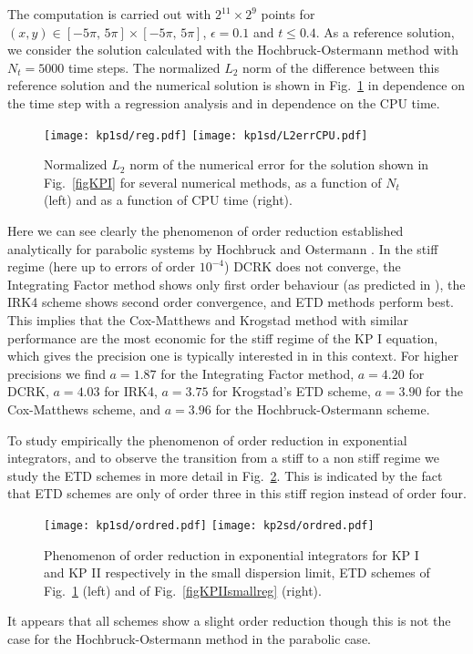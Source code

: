 \documentclass[final]{siamltex}
\begin{document}
The computation
is carried out with $2^{11}\times2^{9}$ points for
$(x, y)\in[-5\pi,\,5\pi]\times[-5\pi,\,5\pi]$,
$\epsilon=0.1$ and $t\leq0.4$. As a reference solution, we consider
the solution calculated with the Hochbruck-Ostermann method with $N_{t}=5000$
time steps. The normalized $L_{2}$ norm of the
difference between this reference solution and the numerical solution
is shown in Fig.~\ref{figKPIsmallreg} in dependence on the time step 
with a regression analysis and  in dependence on the CPU time.
\begin{figure}[htb!]
 \centering
 \texttt{[image: kp1sd/reg.pdf]}
 \texttt{[image: kp1sd/L2errCPU.pdf]}
 \caption{Normalized $L_{2}$ norm of the numerical error for the 
  solution shown in Fig.~\ref{figKPI} for several numerical
  methods, as a function of $N_{t}$  (left) and as a function of CPU 
 time (right).}
 \label{figKPIsmallreg}
\end{figure}
Here we can see clearly the phenomenon of 
order reduction established analytically for parabolic systems by Hochbruck
and Ostermann \cite{HO}. In the stiff regime (here up to 
errors of order $10^{-4}$) DCRK
does not converge, the Integrating Factor method shows only first 
order behaviour (as predicted in \cite{HO}), the IRK4 scheme shows 
second order convergence,  and ETD methods perform 
best. This implies that the Cox-Matthews and Krogstad method with 
similar performance are the most economic for 
the stiff regime of the KP I equation, which gives the precision one 
is typically interested in in this context. For higher precisions we find
$a=1.87$ for the Integrating Factor method, $a=4.20$ for DCRK, $a=4.03$ for IRK4, 
$a=3.75$ for Krogstad's ETD scheme, $a=3.90$ for the Cox-Matthews scheme, and $a=3.96$ 
for the Hochbruck-Ostermann scheme.  




To study empirically the phenomenon of order reduction
in exponential integrators, and to observe the transition from a 
stiff to a non stiff regime we study the ETD schemes in more detail 
in Fig.~\ref{figKPIsmallreg2}. This is
indicated by the fact that ETD schemes are only of order three in this stiff region instead of order four.
\begin{figure}[h!]
 \centering
 \texttt{[image: kp1sd/ordred.pdf]}
 \texttt{[image: kp2sd/ordred.pdf]}
\caption{Phenomenon of order reduction in exponential integrators 
for KP I  and KP II respectively in the small dispersion limit, ETD schemes of 
Fig.~\ref{figKPIsmallreg} (left) and of
Fig.~\ref{figKPIIsmallreg} (right).}
 \label{figKPIsmallreg2}
\end{figure}
It appears that all schemes show a slight order reduction though this 
is not the case for the Hochbruck-Ostermann method in the parabolic 
case. 
\end{document}
